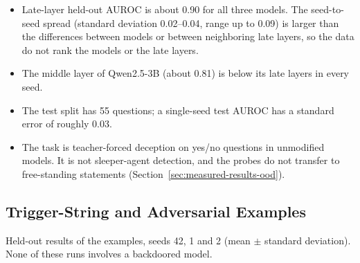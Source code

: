 \documentclass[11pt,letterpaper]{article}
\let\origsubsection\subsection
\renewcommand{\subsection}{\needspace{8\baselineskip}\origsubsection}}
\begin{document}
\begin{infobox}
\begin{itemize}[nosep]
  \item Late-layer held-out AUROC is about 0.90 for all three models. The seed-to-seed spread (standard deviation 0.02--0.04, range up to 0.09) is larger than the differences between models or between neighboring late layers, so the data do not rank the models or the late layers.
  \item The middle layer of Qwen2.5-3B (about 0.81) is below its late layers in every seed.
  \item The test split has 55 questions; a single-seed test AUROC has a standard error of roughly 0.03.
  \item The task is teacher-forced deception on yes/no questions in unmodified models. It is not sleeper-agent detection, and the probes do not transfer to free-standing statements (Section~\ref{sec:measured-results-ood}).
\end{itemize}
\end{infobox}

\subsection{Trigger-String and Adversarial Examples}

Held-out results of the examples, seeds 42, 1 and 2 (mean $\pm$ standard deviation). None of these runs involves a backdoored model.
\end{document}
